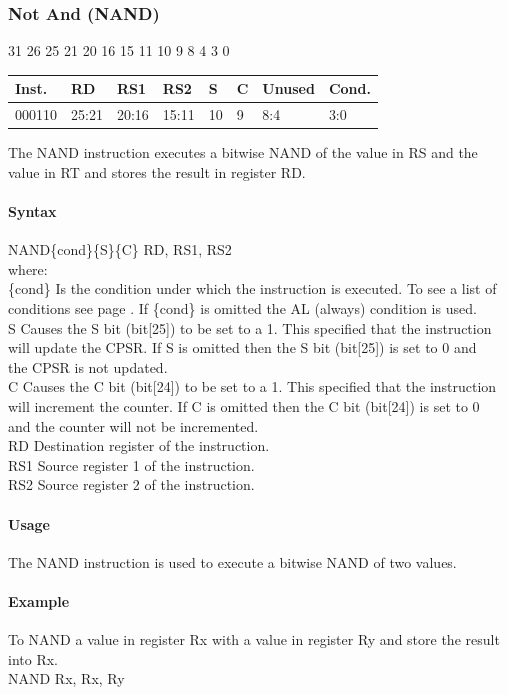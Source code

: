 \documentclass[12pt]{article}
\newcommand{\aTypeInstruction}[6]
{%
    \hspace{1.6cm}31 \hspace{1.15cm}26 \hspace{.04cm}25 \hspace{.8cm}21 \hspace{.04cm}20 \hspace{.8cm}16 \hspace{.04cm}15 \hspace{.8cm}11 \hspace{.04cm}10 \hspace{.275cm}9 \hspace{.275cm}8 \hspace{1.175cm}4 \hspace{.04cm}3 \hspace{1.25cm}0
    \vspace{-.25cm}
    \begin{center}
        \begin{tabular}{ |p{1.8cm}|p{1.5cm}|p{1.5cm}|p{1.5cm}|p{0.3cm}|p{0.3cm}|p{1.5cm}|p{1.5cm}| }
            \hline
            \textbf{Inst.} & \textbf{RD}& \textbf{RS1} & \textbf{RS2} & \textbf{S} & \textbf{C} & Unused & \textbf{Cond.}\\
            \hline
            #1 & 25:21 & 20:16 & 15:11 & 10 & 9 & 8:4 &3:0\\
            \hline
        \end{tabular}
    \end{center}
    
    \noindent
    #2\\
    
    \paragraph{Syntax}
    \begin{flushleft}
    #3\{cond\}\{S\}\{C\} RD, RS1, RS2\\
    \vspace{1em}        %
    where:\\
    \vspace{1em}
    \{cond\}    \hspace{2em} Is the condition under which the instruction is executed. To see a list of\\
                \hspace{5.4em} conditions see page . If \{cond\} is omitted the AL (always) condition is used.\\
    \vspace{1em}    
    S       \hspace{4.5em} Causes the S bit (bit[25]) to be set to a 1. This specified that the instruction\\
            \hspace{5.4em} will update the CPSR. If S is omitted then the S bit (bit[25]) is set to 0 and\\
            \hspace{5.4em} the CPSR is not updated.\\
    \vspace{1em}    
    C       \hspace{4.5em} Causes the C bit (bit[24]) to be set to a 1. This specified that the instruction\\
            \hspace{5.4em} will increment the counter. If C is omitted then the C bit (bit[24]) is set to 0\\
            \hspace{5.4em} and the counter will not be incremented.\\
    \vspace{1em}
    RD  \hspace{3.6em} Destination register of the instruction.\\
    \vspace{1em}
    RS1  \hspace{3.35em} Source register 1 of the instruction.\\
    \vspace{1em}
    RS2  \hspace{3.35em} Source register 2 of the instruction.\\
    \end{flushleft}
    
    \paragraph{Usage}
    \begin{flushleft}
    #4\\
    \end{flushleft}
    \paragraph{Example}
    \begin{flushleft}
    #5\\
    \vspace{1em}
    #6
    \end{flushleft}
    }
\begin{document}
   
   




    \newpage
    \subsubsection{Not And (NAND)}
    
    \aTypeInstruction
    {000110}
    {The NAND instruction executes a bitwise NAND of the value in RS and the value in RT and stores the result in register RD.}
    {NAND}
    {The NAND instruction is used to execute a bitwise NAND of two values.}
    {To NAND a value in register Rx with a value in register Ry and store the result into Rx.}
    {NAND Rx, Rx, Ry}
    
    
\end{document}
